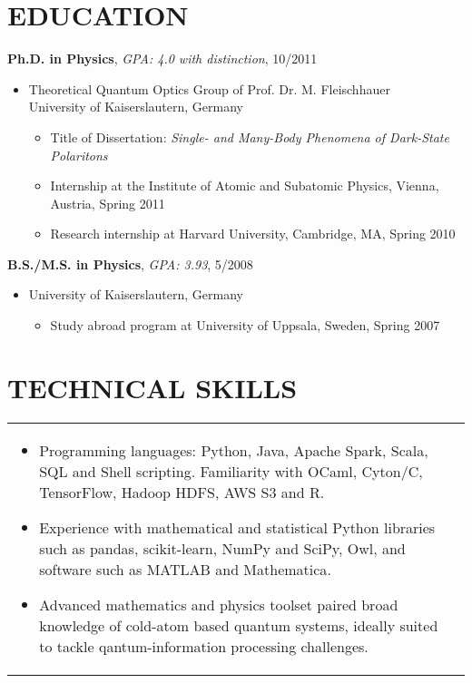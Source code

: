 \documentclass[10pt,centered]{./res} %
\begin{document}
\begin{resume}
\section{\color{ResumeBlue}EDUCATION}

{\bf Ph.D. in Physics}, {\it GPA: 4.0 with distinction}, 10/2011
\begin{itemize}
 \item[] Theoretical Quantum Optics Group of Prof. Dr. M. Fleischhauer\\ University of Kaiserslautern, Germany
    \begin{itemize}
      \item Title of Dissertation: \textit{Single- and Many-Body Phenomena of Dark-State Polaritons}
      \item Internship at the Institute of Atomic and Subatomic Physics, Vienna, Austria, Spring 2011
      \item Research internship at Harvard University, Cambridge, MA, Spring 2010
    \end{itemize}
\end{itemize}
\vspace*{-0.2cm}
{\bf B.S./M.S. in Physics}, {\it GPA: 3.93}, 5/2008
\begin{itemize}
 \item[] University of Kaiserslautern, Germany
     \begin{itemize}
      \item Study abroad program at University of Uppsala, Sweden, Spring 2007
    \end{itemize}
\end{itemize}

\section{\color{ResumeBlue}TECHNICAL SKILLS}

\vspace*{0.2cm}
\hspace*{-.9cm}
\begin{tabular}{p{5.85in}>{\raggedleft\arraybackslash}p{.1in}}
\begin{itemize}
  \item Programming languages: Python, Java, Apache Spark, Scala, SQL and Shell scripting. Familiarity with OCaml, Cyton/C, TensorFlow, Hadoop HDFS, AWS S3 and R.
  \item Experience with mathematical and statistical Python libraries such as pandas, scikit-learn, NumPy and SciPy, Owl, and software such as MATLAB and {\sc Mathematica}.
  \item Advanced mathematics and physics toolset paired broad knowledge of cold-atom based quantum systems, ideally suited to tackle qantum-information processing challenges.
\end{itemize}
 & \\
\end{tabular}


\end{resume}
\end{document}
